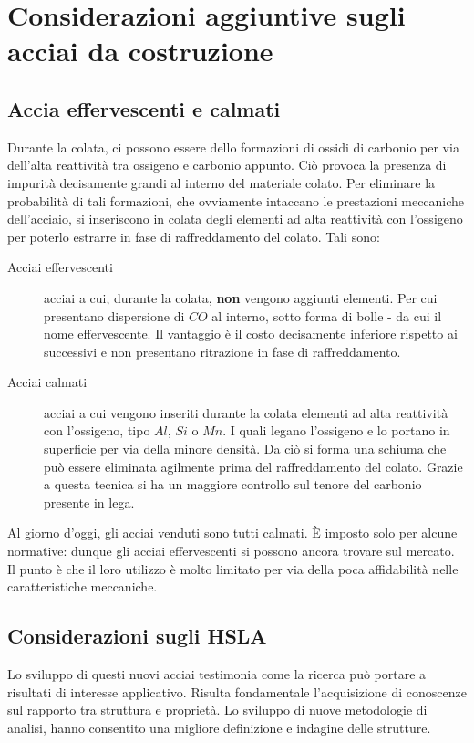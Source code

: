 \chapter{Considerazioni aggiuntive sugli acciai da costruzione}

\section{Accia effervescenti e calmati}\label{sc:AccEffCalm}
Durante la colata, ci possono essere dello formazioni di ossidi di carbonio per via dell'alta 
reattività tra ossigeno e carbonio appunto.
Ciò provoca la presenza di impurità decisamente grandi al interno del materiale colato.
Per eliminare la probabilità di tali formazioni, che ovviamente intaccano le prestazioni 
meccaniche dell'acciaio, si inseriscono in colata degli elementi ad alta reattività con 
l'ossigeno per poterlo estrarre in fase di raffreddamento del colato.
Tali sono:
\begin{description}
\item[Acciai effervescenti] acciai a cui, durante la colata, \textbf{non} vengono aggiunti elementi. Per cui presentano dispersione di $CO$ al interno, sotto forma di bolle - da cui il nome effervescente. Il vantaggio è il costo decisamente inferiore rispetto ai successivi e non presentano ritrazione in fase di raffreddamento.
\item[Acciai calmati] acciai a cui vengono inseriti durante la colata elementi ad alta reattività con l'ossigeno, tipo $Al$, $Si$ o $Mn$. I quali legano l'ossigeno e lo portano in superficie per via della minore densità. Da ciò si forma una schiuma che può essere eliminata agilmente prima del raffreddamento del colato. Grazie a questa tecnica si ha un maggiore controllo sul tenore del carbonio presente in lega. 
\end{description}
Al giorno d'oggi, gli acciai venduti sono tutti calmati. È imposto solo per alcune normative: dunque gli acciai effervescenti si possono ancora trovare sul mercato. Il punto è che il loro utilizzo è molto limitato per via della poca affidabilità nelle caratteristiche meccaniche.

\section{Considerazioni sugli HSLA}\label{sc:HSLACons}
Lo sviluppo di questi nuovi acciai testimonia come la ricerca può portare
a risultati di interesse applicativo.
Risulta fondamentale l'acquisizione di conoscenze sul rapporto tra
struttura e proprietà.
Lo sviluppo di nuove metodologie di analisi, hanno consentito una 
migliore definizione e indagine delle strutture.